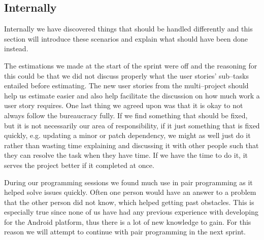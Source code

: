\subsection{Internally}
Internally we have discovered things that should be handled differently and this section will introduce these scenarios and explain what should have been done instead.

The estimations we made at the start of the sprint were off and the reasoning for this could be that we did not discuss properly what the user stories' sub--tasks entailed before estimating.
The new user stories from the multi--project should help us estimate easier and also help facilitate the discussion on how much work a user story requires.
One last thing we agreed upon was that it is okay to not always follow the bureaucracy fully.
If we find something that should be fixed, but it is not necessarily our area of responsibility, if it just something that is fixed quickly, e.g. updating a minor or patch dependency, we might as well just do it rather than wasting time explaining and discussing it with other people such that they can resolve the task when they have time.
If we have the time to do it, it serves the project better if it completed at once.

During our programming sessions we found much use in pair programming as it helped solve issues quickly.
Often one person would have an answer to a problem that the other person did not know, which helped getting past obstacles.
This is especially true since none of us have had any previous experience with developing for the Android platform, thus there is a lot of new knowledge to gain.
For this reason we will attempt to continue with pair programming in the next sprint.
